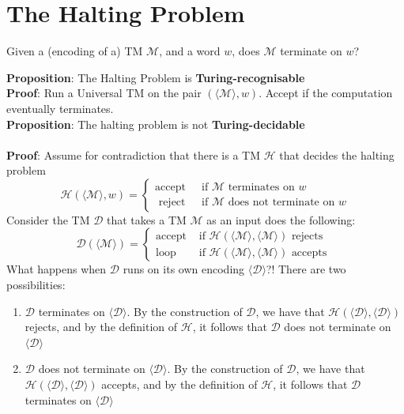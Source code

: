 \documentclass{article}[18pt]
\begin{document}
\section{The Halting Problem}
\begin{defin}
Given a (encoding of a) TM $\mathscr{M}$, and a word $w$, does $\mathscr{M}$ terminate on $w$?
\end{defin}
\textbf{Proposition}: The Halting Problem is \textbf{Turing-recognisable}\\
\textbf{Proof}: Run a Universal TM on the pair $(\langle\mathscr{M}\rangle,w)$. Accept if the computation eventually terminates.\\
\textbf{Proposition}: The halting problem is not \textbf{Turing-decidable}\\
\\
\textbf{Proof}: Assume for contradiction that there is a TM $\mathscr{H}$ that decides the halting problem
$$\mathscr{H}(\langle\mathscr{M}\rangle, w)=\left\{\begin{array}{ll}{\operatorname{accept}} & {\text { if } \mathscr{M} \text { terminates on } w} \\ {\text { reject }} & {\text { if } \mathscr{M} \text { does not terminate on } w}\end{array}\right.$$
Consider the TM $\mathscr{D}$ that takes a TM $\mathscr{M}$ as an input does the following:
$$\mathscr{D}(\langle\mathscr{M}\rangle)=\left\{\begin{array}{ll}{\operatorname{accept}} & {\text { if } \mathscr{H}(\langle\mathscr{M}\rangle,\langle\mathscr{M}\rangle) \text { rejects }} \\ {\operatorname{loop}} & {\text { if } \mathscr{H}(\langle\mathscr{M}\rangle,\langle\mathscr{M}\rangle) \text { accepts }}\end{array}\right.$$
What happens when $\mathscr{D}$ runs on its own encoding $\langle \mathscr{D}\rangle$?! There are two possibilities:
\begin{enumerate}
	\item $\mathscr{D}$ terminates on $\langle \mathscr{D} \rangle$. By the construction of $\mathscr{D}$, we have that $\mathscr{H}(\langle \mathscr{D}\rangle, \langle \mathscr{D} \rangle)$ rejects, and by the definition of $\mathscr{H}$, it follows that $\mathscr{D}$ does not terminate on $\langle \mathscr{D} \rangle$
	\item $\mathscr{D}$ does not terminate on $\langle \mathscr{D} \rangle$. By the construction of $\mathscr{D}$, we have that $\mathscr{H}(\langle \mathscr{D}\rangle, \langle \mathscr{D} \rangle)$ accepts, and by the definition of $\mathscr{H}$, it follows that $\mathscr{D}$ terminates on $\langle \mathscr{D}\rangle$ 
\end{enumerate}
\end{document}
